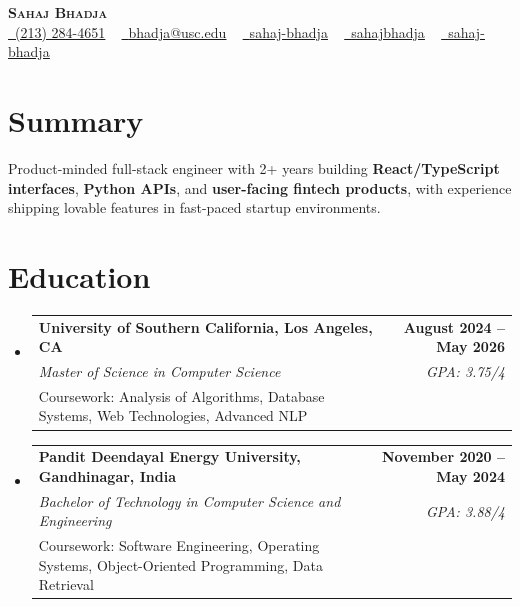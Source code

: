 \documentclass[letterpaper,10pt]{article}
\makeatletter
\newcommand{\resumeEduSubheading}[5]{\vspace{-1pt}\item\begin{tabular*}{1.0\textwidth}[t]{l@{\extracolsep{\fill}}r}\textbf{#1} & \textbf{\small #2} \\\textit{\small #3} & \textit{\small #4} \\\small #5 & \\\end{tabular*}\vspace{-4pt}}
\newcommand{\resumeSubHeadingListStart}{\begin{itemize}[leftmargin=0.0in, label={}]}
\newcommand{\resumeSubHeadingListEnd}{\end{itemize}}
\makeatother
\begin{document}
\begin{center}
{\Huge \scshape \textbf{Sahaj Bhadja}} \\ \vspace{1pt}
\small \href{tel:(213) 284-4651}{\faPhone\ \underline{(213) 284-4651}} ~ \href{mailto: bhadja@usc.edu}{\raisebox{-0.2\height}\faEnvelope\ \underline{bhadja@usc.edu}} ~
\href{https://www.linkedin.com/in/sahaj-bhadja/}{\raisebox{-0.2\height}\faLinkedin\ \underline{sahaj-bhadja}} ~ \href{https://github.com/SAHAJ-BHADJA}{\raisebox{-0.2\height}\faGithub\ \underline{sahajbhadja}} ~
\href{https://sahaj-bhadja.vercel.app/}{\raisebox{-0.2\height}\faGlobe\ \underline{sahaj-bhadja}}
\end{center}
\vspace{-18pt}
\section{Summary}
\begin{itemize}[leftmargin=0.15in, label={}]
\small{\item{Product-minded full-stack engineer with 2+ years building \textbf{React/TypeScript interfaces}, \textbf{Python APIs}, and \textbf{user-facing fintech products}, with experience shipping lovable features in fast-paced startup environments.}}
\end{itemize}
\vspace{-16pt}
\section{Education}
\resumeSubHeadingListStart
\resumeEduSubheading{University of Southern California, Los Angeles, CA}{August 2024 -- May 2026}{Master of Science in Computer Science}{GPA: 3.75/4}{Coursework: Analysis of Algorithms, Database Systems, Web Technologies, Advanced NLP}
\vspace{-9pt}
\resumeEduSubheading{Pandit Deendayal Energy University, Gandhinagar, India}{November 2020 -- May 2024}{Bachelor of Technology in Computer Science and Engineering}{GPA: 3.88/4}{Coursework: Software Engineering, Operating Systems, Object-Oriented Programming, Data Retrieval}
\resumeSubHeadingListEnd
\vspace{-14pt}
\end{document}
